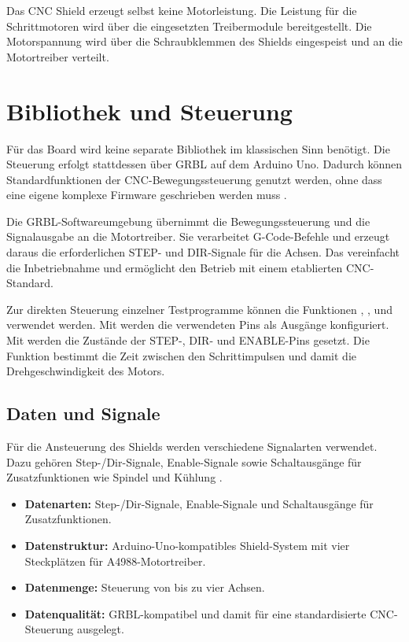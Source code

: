 Das CNC Shield erzeugt selbst keine Motorleistung. Die Leistung für die Schrittmotoren wird über die eingesetzten Treibermodule bereitgestellt. Die Motorspannung wird über die Schraubklemmen des Shields eingespeist und an die Motortreiber verteilt.

\section{Bibliothek und Steuerung}

Für das Board wird keine separate Bibliothek im klassischen Sinn benötigt. Die Steuerung erfolgt stattdessen über GRBL auf dem Arduino Uno. Dadurch können Standardfunktionen der CNC-Bewegungssteuerung genutzt werden, ohne dass eine eigene komplexe Firmware geschrieben werden muss \cite{JoyIT:CNCShield:Anleitung}.

Die GRBL-Softwareumgebung übernimmt die Bewegungssteuerung und die Signalausgabe an die Motortreiber. Sie verarbeitet G-Code-Befehle und erzeugt daraus die erforderlichen STEP- und DIR-Signale für die Achsen. Das vereinfacht die Inbetriebnahme und ermöglicht den Betrieb mit einem etablierten CNC-Standard.

Zur direkten Steuerung einzelner Testprogramme können die Funktionen , ,  und  verwendet werden. Mit  werden die verwendeten Pins als Ausgänge konfiguriert. Mit  werden die Zustände der STEP-, DIR- und ENABLE-Pins gesetzt. Die Funktion  bestimmt die Zeit zwischen den Schrittimpulsen und damit die Drehgeschwindigkeit des Motors.

\subsection{Daten und Signale}

Für die Ansteuerung des Shields werden verschiedene Signalarten verwendet. Dazu gehören Step-/Dir-Signale, Enable-Signale sowie Schaltausgänge für Zusatzfunktionen wie Spindel und Kühlung \cite{JoyIT:CNCShield:Anleitung}.

\begin{itemize}
	\item \textbf{Datenarten:} Step-/Dir-Signale, Enable-Signale und Schaltausgänge für Zusatzfunktionen.
	\item \textbf{Datenstruktur:} Arduino-Uno-kompatibles Shield-System mit vier Steckplätzen für A4988-Motortreiber.
	\item \textbf{Datenmenge:} Steuerung von bis zu vier Achsen.
	\item \textbf{Datenqualität:} GRBL-kompatibel und damit für eine standardisierte CNC-Steuerung ausgelegt.
\end{itemize}


